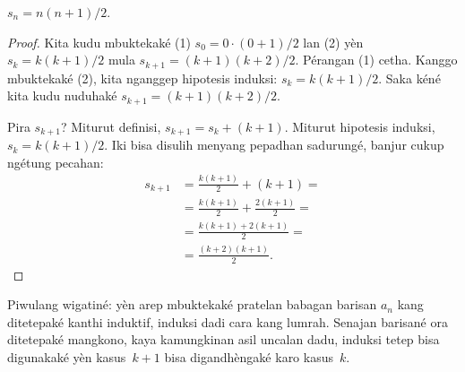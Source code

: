 \documentclass[../../../include/open-logic-section]{subfiles}
\begin{document}
\begin{prop}
  $s_n = n(n+1)/2$.
\end{prop}

\begin{proof}
  Kita kudu mbuktekaké (1)
  $s_0 = 0\cdot(0 + 1)/2$ lan (2)
  yèn $s_k =
  k(k+1)/2$ mula
  $s_{k+1} = (k+1)(k+2)/2$.
  Pérangan (1) cetha. Kanggo
  mbuktekaké (2), kita nganggep
  hipotesis induksi:
  $s_k = k(k+1)/2$. Saka kéné
  kita kudu nuduhaké
  $s_{k+1} = (k+1)(k+2)/2$.

  Pira $s_{k+1}$? Miturut definisi,
  $s_{k+1} = s_k + (k+1)$.
  Miturut hipotesis induksi,
  $s_k = k(k+1)/2$. Iki bisa
  disulih menyang pepadhan sadurungé,
  banjur cukup ngétung pecahan:
  \begin{align*}
    s_{k+1} & = \frac{k(k+1)}{2} + (k+1) = {}\\
    & = \frac{k(k+1)}{2} + \frac{2(k+1)}{2} = {}\\
    & = \frac{k(k+1) + 2(k+1)}{2} = {}\\
    & = \frac{(k+2)(k+1)}{2}.
  \end{align*}
\end{proof}

Piwulang wigatiné: yèn arep mbuktekaké
pratelan babagan barisan $a_n$ kang
ditetepaké kanthi induktif,
induksi dadi cara kang lumrah.
Senajan barisané ora ditetepaké
mangkono, kaya kamungkinan asil
uncalan dadu, induksi tetep bisa
digunakaké yèn kasus~$k+1$
bisa digandhèngaké karo kasus~$k$.
\end{document}
